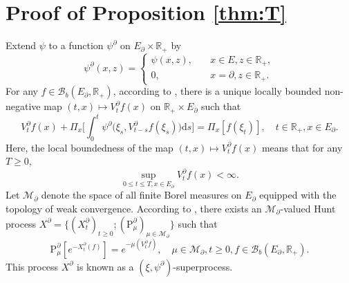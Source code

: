 \documentclass[12pt,a4paper]{amsart}
\numberwithin{equation}{section}
\theoremstyle{plain}
\theoremstyle{definition}
\theoremstyle{remark}
\begin{document}
\section{Proof of Proposition \ref{thm:T}} \label{sec:T}
	Extend $\psi$ to a function $ \psi^\partial$ on $E_\partial \times \mathbb R_+$ by
\[
	\psi^\partial(x, z) = \begin{cases}
	\psi(x,z), &\quad x \in E, z\in \mathbb R_+,
	\\ 0, &\quad x=\partial, z\in \mathbb R_+.
	\end{cases}
\]
	For any $f \in \mathcal B_b(E_\partial,\mathbb R_+)$,  according to \cite[Proposition 2.20]{Li2011Measure-valued}, there is a unique locally bounded non-negative map $(t,x)\mapsto V^\partial_tf(x)$ on $\mathbb R_+\times E_\partial$ such that
\begin{equation}\label{eq:T.004}
	V_t^\partial f(x) + \Pi_x\Big[\int_0^t \psi^\partial\big(\xi_s, V^\partial_{t-s} f(\xi_s)\big) {\mathrm d}s\Big]
	= \Pi_x[f(\xi_t)],
	\quad t\in \mathbb R_+, x\in E_\partial.
\end{equation}
	Here, the local boundedness of the map $(t,x) \mapsto V_t^\partial f(x)$ means that  for any $T\geq 0$,
\[
	\sup_{0\leq t\leq T, x\in E_\partial} V^\partial_tf(x) < \infty.
\]
	Let $\mathcal M_\partial$ denote the space of all finite Borel measures on $E_\partial$ equipped with the topology of weak convergence.
	According to \cite[Proposition 2.21 and Theorem 5.11]{Li2011Measure-valued}, there exists an $\mathcal M_\partial$-valued Hunt process $X^\partial =\{(X^\partial_t)_{t\geq 0}; (\mathrm P^\partial_\mu)_{\mu \in \mathcal M_\partial}\}$ such that
\begin{equation}\label{eq:T.005}
	\mathrm P^\partial_\mu[e^{- X^\partial_t(f)}]
	= e^{- \mu(V^\partial_tf)},
	\quad \mu\in \mathcal M_\partial, t\geq 0, f \in \mathcal B_b(E_\partial,\mathbb R_+).
\end{equation}
	This process $X^\partial$ is known as a $(\xi, \psi^\partial)$-superprocess.
\end{document}
